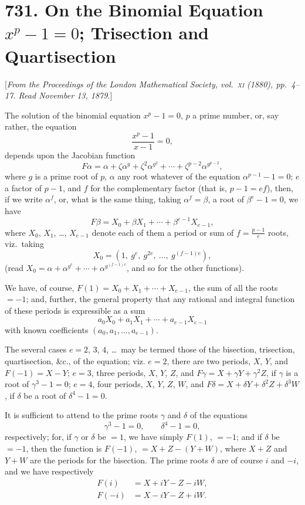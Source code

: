 \documentclass[12pt,a4paper]{article}
\theoremstyle{plain}
\begin{document}
\newpage
\section*{731. On the Binomial Equation $x^p-1=0$; Trisection and Quartisection}

[\textit{From the Proceedings of the London Mathematical Society, vol.~\textsc{xi} (1880), pp.~4--17.
Read November 13, 1879.}]

The solution of the binomial equation $x^p-1=0$, $p$ a prime number,
or, say rather, the equation
\[
\frac{x^p-1}{x-1}=0,
\]
depends upon the Jacobian function
\[
F\alpha = \alpha + \zeta\alpha^g + \zeta^2\alpha^{g^2} + \cdots + \zeta^{p-2}\alpha^{g^{p-2}},
\]
where $g$ is a prime root of $p$, $\alpha$ any root whatever of the equation
$\alpha^{p-1}-1=0$; $e$ a factor of $p-1$, and $f$ for the complementary factor
(that is, $p-1=ef$), then, if we write $\alpha^f$, or, what is the same thing,
taking $\alpha^f=\beta$, a root of $\beta^e-1=0$, we have
\[
F\beta = X_0 + \beta X_1 + \cdots + \beta^{e-1}X_{e-1},
\]
where $X_0$, $X_1$, \dots, $X_{e-1}$ denote each of them a period or sum of
$f=\frac{p-1}{e}$ roots, viz.~taking
\[
X_0 = (1,\ g^e,\ g^{2e},\ \ldots,\ g^{(f-1)e}),
\]
(read $X_0 = \alpha+\alpha^{g^e}+\cdots+\alpha^{g^{(f-1)e}}$, and so for the other functions).

We have, of course, $F(1)=X_0+X_1+\cdots+X_{e-1}$, the sum of all
the roots $=-1$; and, further, the general property that any rational
and integral function of these periods is expressible as a sum
\[
a_0X_0 + a_1X_1 + \cdots + a_{e-1}X_{e-1}
\]
with known coefficients $(a_0, a_1, \ldots, a_{e-1})$.

The several cases $e=2$, $3$, $4$, \dots\ may be termed those of the
bisection, trisection, quartisection, \&c., of the equation; viz.
$e=2$, there are two periods, $X$, $Y$, and $F(-1)=X-Y$;
$e=3$, three periods, $X$, $Y$, $Z$, and $F\gamma=X+\gamma Y+\gamma^2Z$,
if $\gamma$ is a root of $\gamma^3-1=0$;
$e=4$, four periods, $X$, $Y$, $Z$, $W$, and
$F\delta=X+\delta Y+\delta^2Z+\delta^3W$, if $\delta$ be a root of $\delta^4-1=0$.

It is sufficient to attend to the prime roots $\gamma$ and $\delta$ of the equations
\[
\gamma^3-1=0,\qquad \delta^4-1=0,
\]
respectively; for, if $\gamma$ or $\delta$ be $=1$, we have simply $F(1)$, $=-1$;
and if $\delta$ be $=-1$, then the function is $F(-1)$, $=X+Z-(Y+W)$,
where $X+Z$ and $Y+W$ are the periods for the bisection.
The prime roots $\delta$ are of course $i$ and $-i$, and we have respectively
\begin{align*}
F(i) &= X+iY-Z-iW,\\
F(-i) &= X-iY-Z+iW.
\end{align*}
\end{document}
